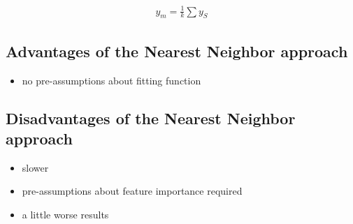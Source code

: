 \documentclass  [
  paper    = a4,
  BCOR     = 10mm,
  twoside,
  fontsize = 12pt,
  fleqn,
  toc      = bibnumbered,
  toc      = listofnumbered,
  numbers  = noendperiod,
  headings = normal,
  listof   = leveldown,
  version  = 3.03
]                                       {scrreprt}
\begin{document}
%

\begin{align}
y_m = \frac{1}{k} \sum y_S \label{eq:knn_regression}
\end{align}

%

\subsection*{Advantages of the Nearest Neighbor approach}

\begin{itemize}
	
	\item no pre-assumptions about fitting function 
	
\end{itemize}

%

\subsection*{Disadvantages of the Nearest Neighbor approach}

\begin{itemize}
	
	\item slower
	
	\item pre-assumptions about feature importance required  
	
	\item a little worse results
	
\end{itemize}

%











\end{document}
